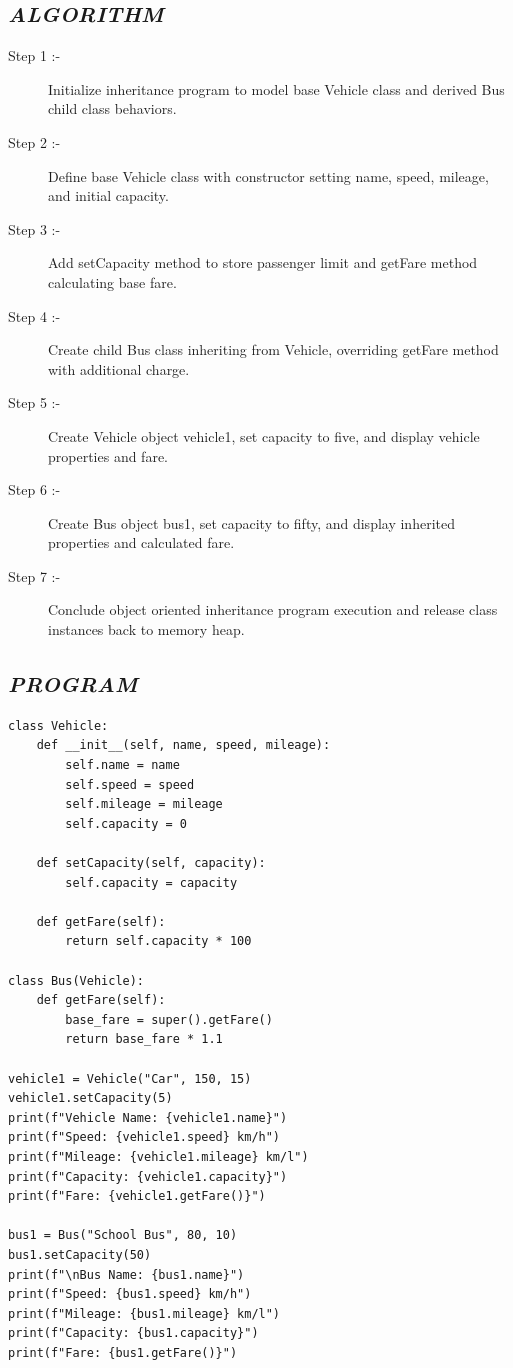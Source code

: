 \documentclass[11pt,a4paper]{article}
\begin{document}
\subsection*{\textit{ALGORITHM}}
\begin{description}
  \item[Step 1 :-] Initialize inheritance program to model base Vehicle class and derived Bus child class behaviors.
  \item[Step 2 :-] Define base Vehicle class with constructor setting name, speed, mileage, and initial capacity.
  \item[Step 3 :-] Add setCapacity method to store passenger limit and getFare method calculating base fare.
  \item[Step 4 :-] Create child Bus class inheriting from Vehicle, overriding getFare method with additional charge.
  \item[Step 5 :-] Create Vehicle object vehicle1, set capacity to five, and display vehicle properties and fare.
  \item[Step 6 :-] Create Bus object bus1, set capacity to fifty, and display inherited properties and calculated fare.
  \item[Step 7 :-] Conclude object oriented inheritance program execution and release class instances back to memory heap.
\end{description}

\subsection*{\textit{PROGRAM}}
\begin{lstlisting}[style=pythonstyle]
class Vehicle: 
    def __init__(self, name, speed, mileage): 
        self.name = name 
        self.speed = speed 
        self.mileage = mileage 
        self.capacity = 0 
 
    def setCapacity(self, capacity): 
        self.capacity = capacity 

    def getFare(self): 
        return self.capacity * 100 
 
class Bus(Vehicle): 
    def getFare(self): 
        base_fare = super().getFare() 
        return base_fare * 1.1 
 
vehicle1 = Vehicle("Car", 150, 15) 
vehicle1.setCapacity(5) 
print(f"Vehicle Name: {vehicle1.name}") 
print(f"Speed: {vehicle1.speed} km/h") 
print(f"Mileage: {vehicle1.mileage} km/l") 
print(f"Capacity: {vehicle1.capacity}") 
print(f"Fare: {vehicle1.getFare()}") 
 
bus1 = Bus("School Bus", 80, 10) 
bus1.setCapacity(50) 
print(f"\nBus Name: {bus1.name}") 
print(f"Speed: {bus1.speed} km/h") 
print(f"Mileage: {bus1.mileage} km/l") 
print(f"Capacity: {bus1.capacity}") 
print(f"Fare: {bus1.getFare()}")
\end{lstlisting}
\end{document}
